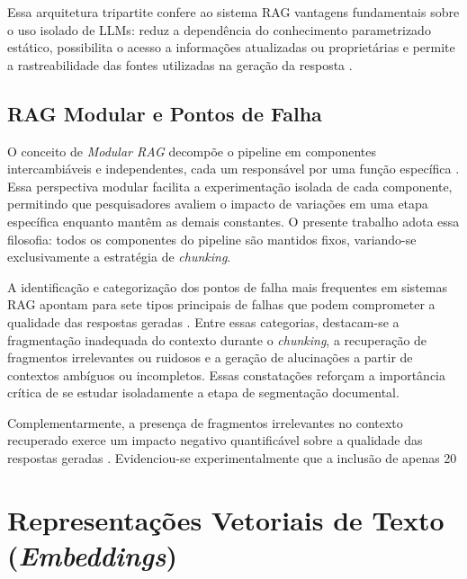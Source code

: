 \documentclass[
	12pt,				%
	openright,			%
	oneside,			%
	a4paper,			%
	tccpreliminar,		%
	]{ABNT-DC-UEL}
\begin{document}
Essa arquitetura tripartite confere ao sistema RAG vantagens fundamentais sobre o uso isolado de LLMs: reduz a dependência do conhecimento parametrizado estático, possibilita o acesso a informações atualizadas ou proprietárias e permite a rastreabilidade das fontes utilizadas na geração da resposta \cite{gao2024survey}.

\subsection{RAG Modular e Pontos de Falha}

O conceito de \textit{Modular RAG} decompõe o pipeline em componentes intercambiáveis e independentes, cada um responsável por uma função específica \cite{gao2024modular}. Essa perspectiva modular facilita a experimentação isolada de cada componente, permitindo que pesquisadores avaliem o impacto de variações em uma etapa específica enquanto mantêm as demais constantes. O presente trabalho adota essa filosofia: todos os componentes do pipeline são mantidos fixos, variando-se exclusivamente a estratégia de \textit{chunking}.

A identificação e categorização dos pontos de falha mais frequentes em sistemas RAG apontam para sete tipos principais de falhas que podem comprometer a qualidade das respostas geradas \cite{barnett2024failure}. Entre essas categorias, destacam-se a fragmentação inadequada do contexto durante o \textit{chunking}, a recuperação de fragmentos irrelevantes ou ruidosos e a geração de alucinações a partir de contextos ambíguos ou incompletos. Essas constatações reforçam a importância crítica de se estudar isoladamente a etapa de segmentação documental.

Complementarmente, a presença de fragmentos irrelevantes no contexto recuperado exerce um impacto negativo quantificável sobre a qualidade das respostas geradas \cite{noise2024power}. Evidenciou-se experimentalmente que a inclusão de apenas 20%


\section{Representações Vetoriais de Texto (\textit{Embeddings})}
\label{sec:embeddings}
\end{document}
